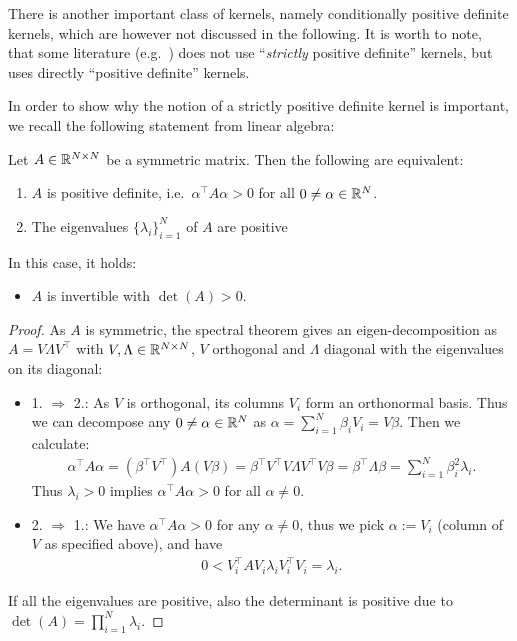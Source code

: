 There is another important class of kernels, namely conditionally positive definite kernels, which are however not discussed in the following.
It is worth to note, that some literature (e.g.\ \cite{wendland2005scattered}) does not use ``\textit{strictly} positive definite'' kernels, but uses directly ``positive definite'' kernels.

In order to show why the notion of a strictly positive definite kernel is important, 
we recall the following statement from linear algebra:

\begin{prop}
\label{prop:linear_algebra}
Let $A \in \mathbb{R}^{N \times N}$ be a symmetric matrix. 
Then the following are equivalent:
\begin{enumerate}
\item $A$ is positive definite, i.e.\ $\alpha^\top A \alpha > 0$ for all $0 \neq \alpha \in \mathbb{R}^N$.
\item The eigenvalues $\{ \lambda_i \}_{i=1}^N$ of $A$ are positive
\end{enumerate}
In this case, it holds:
\begin{itemize}
\item $A$ is invertible with $\det(A) > 0$.
\end{itemize}
\end{prop}

\begin{proof}
As $A$ is symmetric, the spectral theorem gives an eigen-decomposition as $A = V\Lambda V^\top$ with $V, \Lambda \in \mathbb{R}^{N \times N}$, $V$ orthogonal and $\Lambda$ diagonal with the eigenvalues on its diagonal:
\begin{itemize}
\item 1. $\Rightarrow$ 2.: As $V$ is orthogonal, its columns $V_i$ form an orthonormal basis. Thus we can decompose any $0 \neq \alpha \in \mathbb{R}^N$ as $\alpha = \sum_{i=1}^N \beta_i V_i = V\beta$. Then we calculate:
\begin{align*}
\alpha^\top A \alpha = (\beta^\top V^\top)A(V \beta) = \beta^\top V^\top V \Lambda V^\top V \beta = \beta^\top \Lambda \beta = \sum_{i=1}^N \beta_i^2 \lambda_i.
\end{align*}
Thus $\lambda_i > 0$ implies $\alpha^\top A \alpha > 0$ for all $\alpha \neq 0$.
\item 2. $\Rightarrow$ 1.: We have $\alpha^\top A \alpha > 0$ for any $\alpha \neq 0$, thus we pick $\alpha := V_i$ (column of $V$ as specified above), and have
\begin{align*}
0 < V_i^\top A V_i \lambda_i V_i^\top V_i = \lambda_i.
\end{align*}
\end{itemize}
If all the eigenvalues are positive, also the determinant is positive due to $\det(A) = \prod_{i=1}^N \lambda_i$.
\end{proof}

